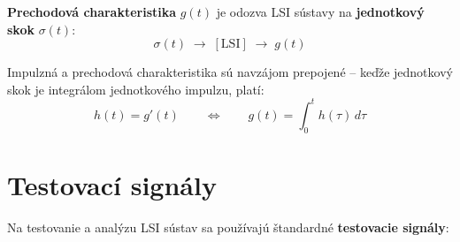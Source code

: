 \textbf{Prechodová charakteristika} $g(t)$ je odozva LSI sústavy na \textbf{jednotkový skok} $\sigma(t)$:
\begin{equation}
  \sigma(t) \;\rightarrow\; [\text{LSI}] \;\rightarrow\; g(t)
\end{equation}

Impulzná a prechodová charakteristika sú navzájom prepojené -- keďže jednotkový skok je integrálom jednotkového impulzu, platí:
\begin{equation}
  h(t) = g'(t) \qquad \Leftrightarrow \qquad g(t) = \int_0^t h(\tau)\,d\tau
\end{equation}

\section{Testovací signály}

Na testovanie a analýzu LSI sústav sa používajú štandardné \textbf{testovacie signály}:

